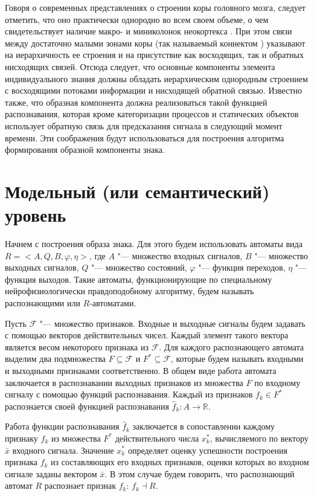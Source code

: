 \documentclass[a4paper, 12pt]{article}
\numberwithin{equation}{section}
\begin{document}
	Говоря о современных представлениях о строении коры головного мозга, следует отметить, что оно практически однородно во всем своем объеме, о чем свидетельствует наличие макро- и миниколонок неокортекса \cite{Mountcastle1998,Rockland2010}. При этом связи между достаточно малыми зонами коры (так называемый коннектом \cite{Zador2012}) указывают на иерархичность ее строения и на присутствие как восходящих, так и обратных нисходящих связей. Отсюда следует, что основные компоненты элемента индивидуального знания должны обладать иерархическим однородным строением с восходящими потоками информации и нисходящей обратной связью. Известно также, что образная компонента должна реализоваться такой функцией распознавания, которая кроме категоризации процессов и статических объектов использует обратную связь для предсказания сигнала в следующий момент времени. Эти соображения будут использоваться для построения алгоритма формирования образной компоненты знака.
	
	\section{Модельный (или семантический) уровень}\label{sect:seman}
	Начнем с построения образа знака. Для этого будем использовать автоматы вида  $R=<A,Q,B,\varphi, \eta>$, где $A$ "--- множество входных сигналов, $B$ "--- множество выходных сигналов, $Q$ "--- множество состояний, $\varphi$ "--- функция переходов, $\eta$ "--- функция выходов. Такие автоматы, функционирующие по специальному нейрофизиологически правдоподобному алгоритму, будем называть распознающими или $R$-автоматами. 
	
	Пусть $\mathcal F$ "--- множество признаков. Входные и выходные сигналы будем задавать с помощью  векторов действительных чисел. Каждый элемент такого вектора является весом некоторого признака из $\mathcal F$. Для каждого распознающего автомата выделим два подмножества $F\subseteq\mathcal F$ и $F^*\subseteq\mathcal F$, которые будем называть входными и выходными признаками соответственно. В общем виде работа автомата заключается в распознавании выходных признаков из множества $F$ по входному сигналу с помощью функций распознавания. Каждый из признаков $f_k\in F^*$ распознается своей функцией распознавания $\hat f_k: A\rightarrow \mathbb R$.
	
	Работа функции распознавания $\hat f_k$ заключается в сопоставлении каждому признаку $f_k$ из множества $F^*$ действительного числа $x_k^*$, вычисляемого по вектору $\bar x$ входного сигнала. Значение $x_k^*$ определяет оценку успешности построения признака $f_k$ из составляющих его входных признаков, оценки которых во входном сигнале заданы вектором $\bar x$. В этом случае будем говорить, что распознающий автомат $R$ распознает признак $f_k$: $f_k\dashv R$.
	
\end{document}
